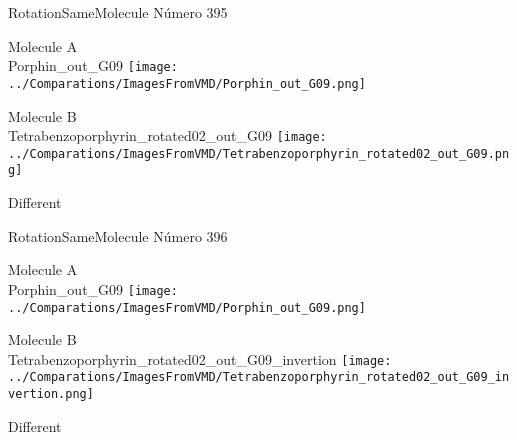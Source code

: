 \vtab[-2cm]
\begin{center}
{\large RotationSameMolecule \tab Número 395}
\end{center}
\begin{multicols}{2}
\begin{center}
Molecule A \\ 
Porphin\_out\_G09
\texttt{[image: ../Comparations/ImagesFromVMD/Porphin\_out\_G09.png]}
\\
\vtab

\columnbreak
Molecule B \\ 
Tetrabenzoporphyrin\_rotated02\_out\_G09
\texttt{[image: ../Comparations/ImagesFromVMD/Tetrabenzoporphyrin\_rotated02\_out\_G09.png]}
\\
\vtab


\end{center}
\end{multicols}
\begin{center}
\vtab
\vtab
\textcolor{NavyBlue}{\Large Different}
\end{center}

 \newpage

\vtab[-2cm]
\begin{center}
{\large RotationSameMolecule \tab Número 396}
\end{center}
\begin{multicols}{2}
\begin{center}
Molecule A \\ 
Porphin\_out\_G09
\texttt{[image: ../Comparations/ImagesFromVMD/Porphin\_out\_G09.png]}
\\
\vtab

\columnbreak
Molecule B \\ 
Tetrabenzoporphyrin\_rotated02\_out\_G09\_invertion
\texttt{[image: ../Comparations/ImagesFromVMD/Tetrabenzoporphyrin\_rotated02\_out\_G09\_invertion.png]}
\\
\vtab


\end{center}
\end{multicols}
\begin{center}
\vtab
\vtab
\textcolor{NavyBlue}{\Large Different}
\end{center}

 \newpage

